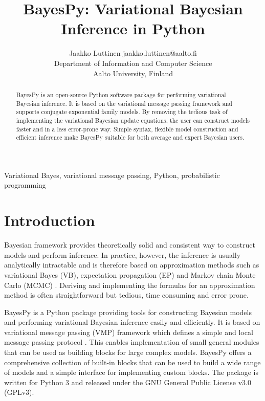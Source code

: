 \documentclass[twoside,11pt]{article}
\begin{document}
\title{BayesPy: Variational Bayesian Inference in Python}

\author{\name Jaakko Luttinen \email jaakko.luttinen@aalto.fi \\
       \addr Department of Information and Computer Science\\
       Aalto University, Finland}


\maketitle

\begin{abstract}%
  BayesPy is an open-source Python software package for performing variational
  Bayesian inference.  It is based on the variational message passing framework
  and supports conjugate exponential family models.  By removing the tedious
  task of implementing the variational Bayesian update equations, the user can
  construct models faster and in a less error-prone way.  Simple syntax,
  flexible model construction and efficient inference make BayesPy suitable for
  both average and expert Bayesian users.
\end{abstract}

\begin{keywords}
  Variational Bayes, variational message passing, Python, probabilistic
  programming
\end{keywords}

\section{Introduction}

Bayesian framework provides theoretically solid and consistent way to construct
models and perform inference.  In practice, however, the inference is usually
analytically intractable and is therefore based on approximation methods such as
variational Bayes (VB), expectation propagation (EP) and Markov chain Monte
Carlo (MCMC) \citep{Bishop:2006}.  Deriving and implementing the formulas for an
approximation method is often straightforward but tedious, time consuming and
error prone.


BayesPy is a Python package providing tools for constructing Bayesian models and
performing variational Bayesian inference easily and efficiently.  It is based
on variational message passing (VMP) framework which defines a simple and local
message passing protocol \citep{Winn:2005}.  This enables implementation of small
general modules that can be used as building blocks for large complex models.
BayesPy offers a comprehensive collection of built-in blocks that can be used to
build a wide range of models and a simple interface for implementing custom
blocks.  The package is written for Python 3 and released under the GNU General
Public License v3.0 (GPLv3).
\end{document}
